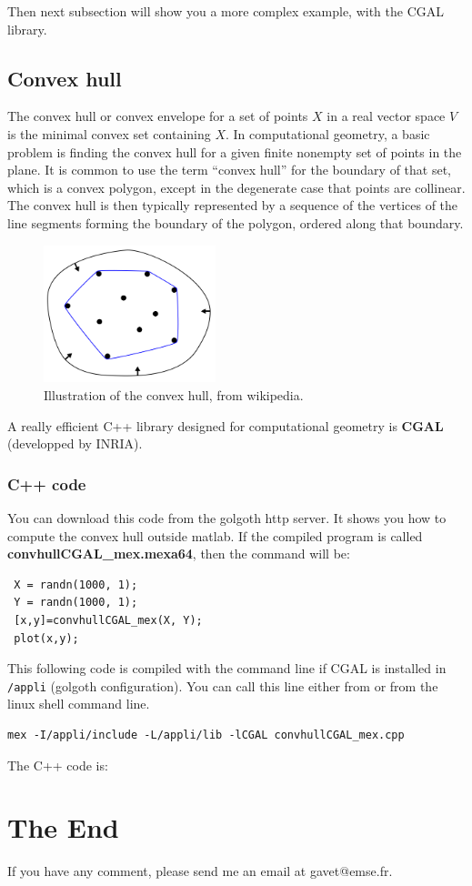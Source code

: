 \documentclass{emse-exo}
\begin{document}


Then next subsection will show you a more complex example, with the CGAL library.

\subsection{Convex hull}
The convex hull or convex envelope for a set of points $X$ in a real vector space $V$ is the minimal convex set containing $X$.
In computational geometry, a basic problem is finding the convex hull for a given finite nonempty set of points in the plane. It is common to use the term ``convex hull'' for the boundary of that set, which is a convex polygon, except in the degenerate case that points are collinear. The convex hull is then typically represented by a sequence of the vertices of the line segments forming the boundary of the polygon, ordered along that boundary.

\begin{figure}[htbp]
\centering
\includegraphics[width=5cm]{convhull.png}
 \caption{Illustration of the convex hull, from wikipedia.}
\end{figure}

A really efficient C++ library designed for computational geometry is \textbf{CGAL} (developped by INRIA).
\subsubsection{C++ code}
You can download this code from the golgoth http server. It shows you how to compute the convex hull outside matlab. If the compiled program is called \textbf{convhullCGAL\_mex.mexa64}, then the \matlabregistered{} command will be:
\begin{lstlisting}
 X = randn(1000, 1);
 Y = randn(1000, 1);
 [x,y]=convhullCGAL_mex(X, Y);
 plot(x,y);
\end{lstlisting}

This following code is compiled with the command line if CGAL is installed in \verb!/appli! (golgoth configuration). You can call this line either from \matlabregistered{} or from the linux shell command line.
\begin{lstlisting}[language=ksh]
mex -I/appli/include -L/appli/lib -lCGAL convhullCGAL_mex.cpp
\end{lstlisting}

The C++ code is:


\section*{The End}
If you have any comment, please send me an email at gavet@emse.fr.
\end{document}
